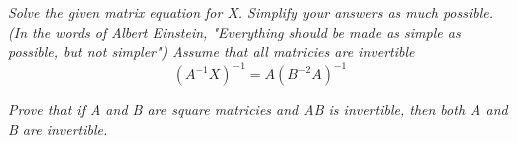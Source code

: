 \documentclass[12pt,letterpaper]{hmcpset}
\begin{document}
\begin{solution}

\end{solution}
\newpage
\begin{problem}[3.3.22]
\textit{Solve the given matrix equation for X. Simplify your answers as much possible. (In the words of Albert Einstein, "Everything should be made as simple as possible, but not simpler") Assume that all matricies are invertible}
$$ (A^{-1}X)^{-1}= A(B^{-2}A)^{-1}$$
\end{problem}
\newpage
\begin{problem}[3.3.47]
\textit{Prove that if A and B are square matricies and AB is invertible, then both A and B are invertible.}
\end{problem}
\end{document}
